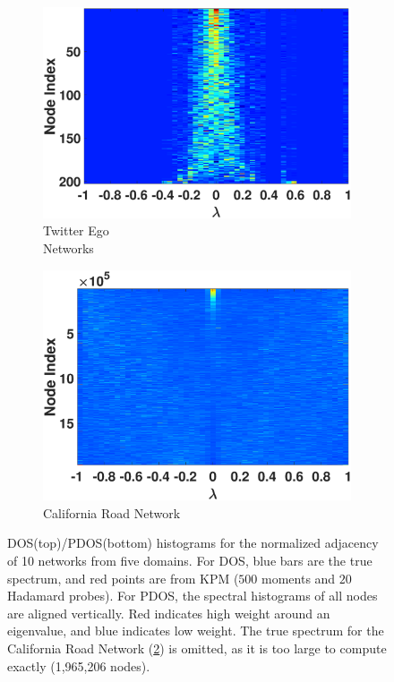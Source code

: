 \begin{figure}[htp]
\begin{subfigure}[t]{0.19\textwidth}
    \includegraphics[width=\textwidth,trim = .4cm 0.5cm 3.5cm 1.3cm,clip]
    {./ndos/pics/twitter_ldos}
    \caption{Twitter Ego \\Networks}
    \label{fig:twitter_ldos}
  \end{subfigure}
  \begin{subfigure}[t]{0.19\textwidth}
    \centering  
    \captionsetup{justification=centering,font=scriptsize}
    \includegraphics[width=\textwidth,trim = .4cm 0.5cm 3.5cm 0.3cm,clip]
    {./ndos/pics/roadca_ldos}
    \caption{California Road Network}
    \label{fig:roadca_ldos}
  \end{subfigure}
  \caption{DOS(top)/PDOS(bottom) histograms for the normalized adjacency of 10
  networks from five domains. For DOS, blue bars are the true spectrum, and red
  points are from KPM ($500$ moments and $20$ Hadamard probes). For PDOS, the
  spectral histograms of all nodes are aligned vertically. Red indicates high
  weight around an eigenvalue, and blue indicates low weight. The true spectrum
  for the California Road Network (\ref{fig:roadca_ldos}) is omitted, as it is
  too large to compute exactly (1,965,206 nodes).}\label{fig:gallery}
\end{figure}

